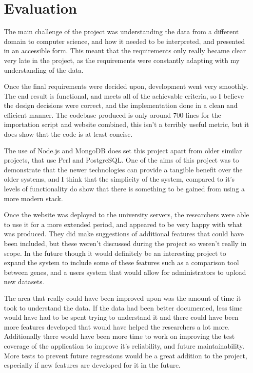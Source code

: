 \chapter{Evaluation}
The main challenge of the project was understanding the data from a different domain to computer science, and how it needed to be interpreted, and presented in an accessible form. This meant that the requirements only really became clear very late in the project, as the requirements were constantly adapting with my understanding of the data. 

Once the final requirements were decided upon, development went very smoothly. The end result is functional, and meets all of the achievable criteria, so I believe the design decisions were correct, and the implementation done in a clean and efficient manner. The codebase produced is only around 700 lines for the importation script and website combined, this isn't a terribly useful metric, but it does show that the code is at least concise.

The use of Node.js and MongoDB does set this project apart from older similar projects, that use Perl and PostgreSQL. One of the aims of this project was to demonstrate that the newer technologies can provide a tangible benefit over the older systems, and I think that the simplicity of the system, compared to it's levels of functionality do show that there is something to be gained from using a more modern stack. 

Once the website was deployed to the university servers, the researchers were able to use it for a more extended period, and appeared to be very happy with what was produced. They did make suggestions of additional features that could have been included, but these weren't discussed during the project so weren't really in scope. In the future though it would definitely be an interesting project to expand the system to include some of these features such as a comparison tool between genes, and a users system that would allow for administrators to upload new datasets.

The area that really could have been improved upon was the amount of time it took to understand the data. If the data had been better documented, less time would have had to be spent trying to understand it and there could have been more features developed that would have helped the researchers a lot more. Additionally there would have been more time to work on improving the test coverage of the application to improve it's reliability, and future maintainability. More tests to prevent future regressions would be a great addition to the project, especially if new features are developed for it in the future.


